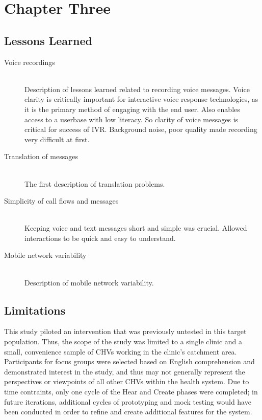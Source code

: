 \chapter{Chapter Three}


\section{Lessons Learned}


\begin{description}
	\item[Voice recordings] \hfill \\
	Description of lessons learned related to recording voice messages. Voice clarity is critically important for interactive voice response technologies, as it is the primary method of engaging with the end user. Also enables access to a userbase with low literacy. So clarity of voice messages is critical for success of IVR. Background noise, poor quality made recording very difficult at first. 
	\item[Translation of messages] \hfill \\
	The first description of translation problems.
	\item[Simplicity of call flows and messages] \hfill \\
	Keeping voice and text messages short and simple was crucial. Allowed interactions to be quick and easy to understand. 
	\item[Mobile network variability] \hfill \\
	Description of mobile network variability. 
	
\end{description}


\section{Limitations}
This study piloted an intervention that was previously untested in this target population. Thus, the scope of the study was limited to a single clinic and a small, convenience sample of CHVs working in the clinic's catchment area. Participants for focus groups were selected based on English comprehension and demonstrated interest in the study, and thus may not generally represent the perspectives or viewpoints of all other CHVs within the health system. Due to time contraints, only one cycle of the Hear and Create phases were completed; in future iterations, additional cycles of prototyping and mock testing would have been conducted in order to refine and create additional features for the system.  

